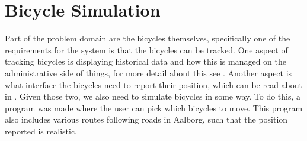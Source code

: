 \section{Bicycle Simulation}
Part of the problem domain are the bicycles themselves, specifically one of the requirements for the system is that the bicycles can be tracked.
One aspect of tracking bicycles is displaying historical data and how this is managed on the administrative side of things, for more detail about this see .
Another aspect is what interface the bicycles need to report their position, which can be read about in . 
Given those two, we also need to simulate bicycles in some way.
To do this, a program was made where the user can pick which bicycles to move. 
This program also includes various routes following roads in Aalborg, such that the position reported is realistic.